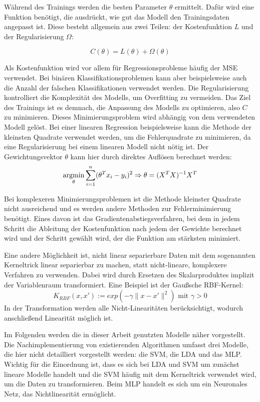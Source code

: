		Während des Trainings werden die besten Parameter $\theta$ ermittelt. Dafür wird eine Funktion benötigt, die ausdrückt, wie gut das Modell den Trainingsdaten angepasst ist. Diese besteht allgemein aus zwei Teilen: der Kostenfunktion $L$ und der Regularisierung $\Omega$:
		
		\[
			C(\theta)= L(\theta) + \Omega(\theta)
		\]
		
		Als Kostenfunktion wird vor allem für Regressionsprobleme häufig der \ac{MSE} verwendet. Bei binären Klassifikationsproblemen kann aber beispielsweise auch die Anzahl der falschen Klassifikationen verwendet werden. Die Regularisierung kontrolliert die Komplexität des Modells, um Overfitting zu vermeiden. Das Ziel des Trainings ist es demnach, die Anpassung des Modells zu optimieren, also $C$ zu minimieren. Dieses Minimierungsproblem wird abhängig von dem verwendeten Modell gelöst. Bei einer linearen Regression beispielsweise kann die Methode der kleinsten Quadrate verwendet werden, um die Fehlerquadrate zu minimieren, da eine Regularisierung bei einem linearen Modell nicht nötig ist. Der Gewichtungsvektor $\theta$ kann hier durch direktes Auflösen berechnet werden:
		\[
			\operatorname*{argmin}_{\theta} \sum_{i=1}^{n} (\theta^T x_i - y_i)^2
			\Rightarrow \theta = (X^T X)^{-1} X^T
		\]
		
		Bei komplexeren Minimierungsproblemen ist die Methode kleinster Quadrate nicht ausreichend und es werden andere Methoden zur Fehlerminimierung benötigt. Eines davon ist das Gradientenabstiegsverfahren, bei dem in jedem Schritt die Ableitung der Kostenfunktion nach jedem der Gewichte berechnet wird und der Schritt gewählt wird, der die Funktion am stärksten minimiert.
		
		Eine andere Möglichkeit ist, nicht linear separierbare Daten mit dem sogenannten Kerneltrick linear separierbar zu machen, statt nicht-lineare, komplexere Verfahren zu verwenden. Dabei wird durch Ersetzen des Skalarproduktes implizit der Variablenraum transformiert. Eine Beispiel ist der Gaußsche RBF-Kernel:
		\[
			K_{RBF} (x, x\prime) := exp(-\gamma \|x - x\prime\|^2) \text{ mit } \gamma > 0
		\]
		In der Transformation werden alle Nicht-Linearitäten berücksichtigt, wodurch anschließend Linearität möglich ist. %
		
		Im Folgenden werden die in dieser Arbeit genutzten Modelle näher vorgestellt. Die Nachimplementierung von existierenden Algorithmen umfasst drei Modelle, die hier nicht detailliert vorgestellt werden: die \ac{SVM}, die \ac{LDA} und das \ac{MLP}. Wichtig für die Einordnung ist, dass es sich bei \ac{LDA} und \ac{SVM} um zunächst lineare Modelle handelt und die \ac{SVM} häufig mit dem Kerneltrick verwendet wird, um die Daten zu transformieren. Beim \ac{MLP} handelt es sich um ein Neuronales Netz, das Nichtlinearität ermöglicht.

